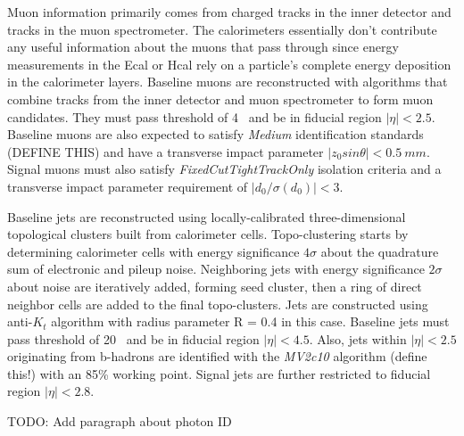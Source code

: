 Muon information primarily comes from charged tracks in the inner detector and tracks in the muon spectrometer.  The calorimeters essentially don't contribute any useful information about the muons that pass through since energy measurements in the Ecal or Hcal rely on a particle's complete energy deposition in the calorimeter layers.   Baseline muons are reconstructed with algorithms that combine tracks from the inner detector and muon spectrometer to form muon candidates.  They must pass \pt{} threshold of 4 ~\GeV and be in fiducial region $|\eta | < 2.5$. Baseline muons are also expected to satisfy \textit{Medium} identification standards (DEFINE THIS) and have a transverse impact parameter $|z_0sin\theta| < 0.5~mm$.  Signal muons must also satisfy \textit{FixedCutTightTrackOnly} isolation criteria and a transverse impact parameter requirement of $|d_0/\sigma(d_0)| < 3$.

Baseline jets are reconstructed using locally-calibrated three-dimensional topological clusters built from calorimeter cells.  Topo-clustering starts by determining calorimeter cells with energy significance $4\sigma$ about the quadrature sum of electronic and pileup noise.  Neighboring jets with energy significance $2\sigma$ about noise are iteratively added, forming seed cluster, then a ring of direct neighbor cells are added to the final topo-clusters.  Jets are constructed using anti-$K_t$ algorithm with radius parameter R = 0.4 in this case. Baseline jets must pass \pt{} threshold of 20 ~\GeV and be in fiducial region $|\eta | < 4.5$.  Also, jets within $|\eta | < 2.5$ originating from b-hadrons are identified with the \textit{MV2c10} algorithm (define this!) with an 85\% working point.  Signal jets are further restricted to fiducial region $|\eta | < 2.8$.

TODO: Add paragraph about photon ID

